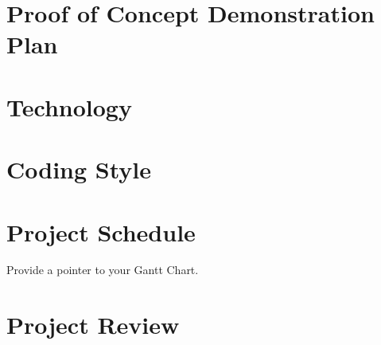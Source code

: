 \documentclass{article}
\begin{document}
\section{Proof of Concept Demonstration Plan}

\section{Technology}

\section{Coding Style}

\section{Project Schedule}

Provide a pointer to your Gantt Chart.

\section{Project Review}
\end{document}
